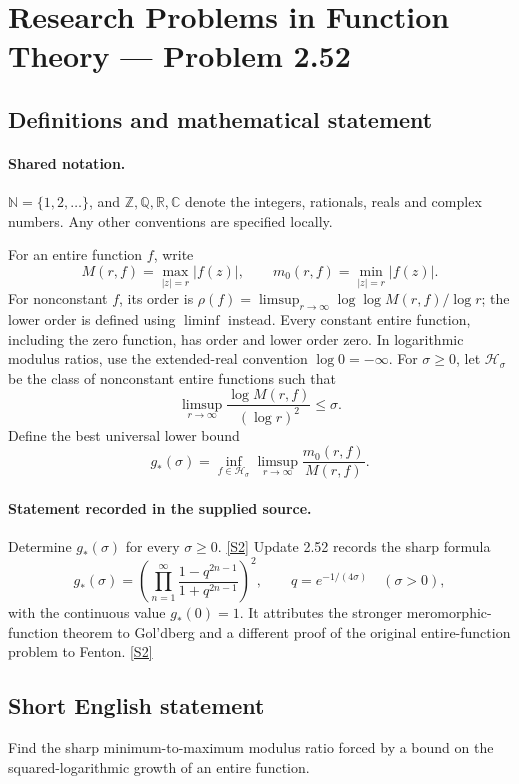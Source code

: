 \documentclass[11pt]{article}
\newcommand{\sref}[2]{\hyperlink{source:#1:#2}{[S#2]}}
\begin{document}
\section{Research Problems in Function Theory — Problem 2.52}\label{statement}

\subsection{Definitions and mathematical statement}

\paragraph{Shared notation.}$\mathbb N=\{1,2,\ldots\}$, and $\mathbb Z,\mathbb Q,\mathbb R,\mathbb C$ denote the integers, rationals, reals and complex numbers. Any other conventions are specified locally.


For an entire function $f$, write
\[
 M(r,f)=\max_{|z|=r}|f(z)|,\qquad m_0(r,f)=\min_{|z|=r}|f(z)|.
\]
For nonconstant $f$, its order is $\rho(f)=\limsup_{r\to\infty}\log\log M(r,f)/\log r$;
the lower order is defined using $\liminf$ instead. Every constant entire function, including the zero function, has order and lower order zero. In logarithmic modulus ratios, use the extended-real convention $\log0=-\infty$.
For $\sigma\ge0$, let $\mathcal H_\sigma$ be the class of nonconstant entire functions such that
\[\limsup_{r\to\infty}\frac{\log M(r,f)}{(\log r)^2}\le\sigma.\]
Define the best universal lower bound
\[g_*(\sigma)=\inf_{f\in\mathcal H_\sigma}\limsup_{r\to\infty}\frac{m_0(r,f)}{M(r,f)}.\]

\paragraph{Statement recorded in the supplied source.}
Determine $g_*(\sigma)$ for every $\sigma\ge0$. \sref{statement}{2}
Update 2.52 records the sharp formula
\[
g_*(\sigma)=\left(\prod_{n=1}^{\infty}\frac{1-q^{2n-1}}{1+q^{2n-1}}\right)^2,
\qquad q=e^{-1/(4\sigma)}\quad(\sigma>0),
\]
with the continuous value $g_*(0)=1$. It attributes the stronger meromorphic-function theorem to Gol'dberg and a different proof of the original entire-function problem to Fenton. \sref{statement}{2}
\subsection{Short English statement}
Find the sharp minimum-to-maximum modulus ratio forced by a bound on the squared-logarithmic growth of an entire function.
\end{document}
